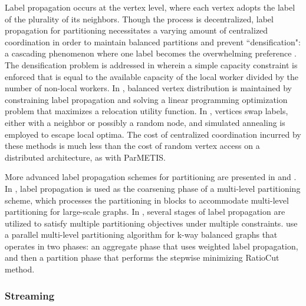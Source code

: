 \documentclass[reprint,twocolumn,showpacs,preprintnumbers,amsmath, aps,pre,amssymb]{revtex4-1}
\begin{document}
Label propagation occurs at the vertex level, where each vertex adopts the label of the plurality of its neighbors.  Though the process is decentralized, label propagation for partitioning necessitates a varying amount of centralized coordination in order to maintain balanced partitions and prevent ``densification": a cascading phenomenon where one label becomes the overwhelming preference \cite{Raghavan2007}. The densification problem is addressed in \cite{Vaquero2013} wherein a simple capacity constraint is enforced that is equal to the available capacity of the local worker divided by the number of non-local workers.  In \cite{Ugander2013}, balanced vertex distribution is maintained by constraining label propagation and solving a linear programming optimization problem that maximizes a relocation utility function. In \cite{Rahimian2013}, vertices swap labels, either with a neighbor or possibly a random node, and simulated annealing is employed to escape local optima.  The cost of centralized coordination incurred by these methods is much less than the cost of random vertex access on a distributed architecture, as with ParMETIS.  

More advanced label propagation schemes for partitioning are presented in \cite{Wang2014} and \cite{Madduri}.  In \cite{Wang2014}, label propagation is used as the coarsening phase of a multi-level partitioning scheme, which processes the partitioning in blocks to accommodate multi-level partitioning for large-scale graphs.  In \cite{Madduri}, several stages of label propagation are utilized to satisfy multiple partitioning objectives under multiple constraints.  \cite{Zeng2012} use a parallel multi-level partitioning algorithm for k-way balanced graphs that operates in two phases: an aggregate phase that uses weighted label propagation, and then a partition phase that performs the stepwise minimizing RatioCut method.

\subsubsection{Streaming}
\label{subsubsec:streaming}
\end{document}
